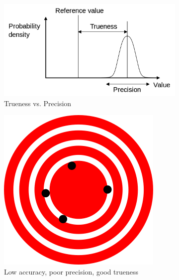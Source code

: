 \begin{figure}[htbp]
 \centering
 \begin{subfigure}[b]{0.5\textwidth}
 \includegraphics[width=\textwidth]{pic/trueness_and_precision.png}
 \caption{Trueness vs. Precision}
 \label{sfig:trueness_vs_precision}
 \end{subfigure}
 \begin{subfigure}[b]{0.2\textwidth}
 \includegraphics[width=\textwidth]{pic/High_accuracy_Low_precision.png}
 \caption{Low accuracy, poor precision, good trueness}
 \label{sfig:poor_precision}
 \end{subfigure}
 \begin{subfigure}[b]{0.2\textwidth}

\end{subfigure}
\end{figure}
